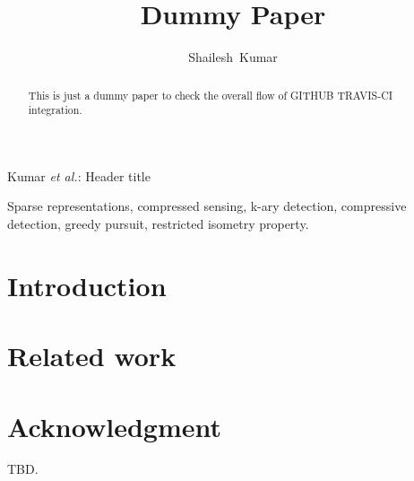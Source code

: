 \documentclass[journal, draftcls, onecolumn]{IEEEtran} %
\begin{document}
    
    \title{Dummy Paper}   
    \author{Shailesh~Kumar}

    
    
    
    \markboth{}%
    {Kumar \MakeLowercase{\textit{et al.}}: Header title}
    
    \maketitle
    
    \begin{abstract}
    This is just a dummy paper to check the overall flow of GITHUB TRAVIS-CI integration.
    \end{abstract}
    
    \begin{IEEEkeywords}
    Sparse representations, compressed sensing, 
    k-ary detection, compressive detection, 
    greedy pursuit, restricted isometry property.
    \end{IEEEkeywords}
    
    
    \IEEEpeerreviewmaketitle
    
    \section{Introduction}
    
    \cite{davenport2010signal}
    
    \section{Related work}
    
    
    
    \begin{appendices}
    
    
    \end{appendices}
    
    
    \section*{Acknowledgment}
    TBD.
    
    
\end{document}
